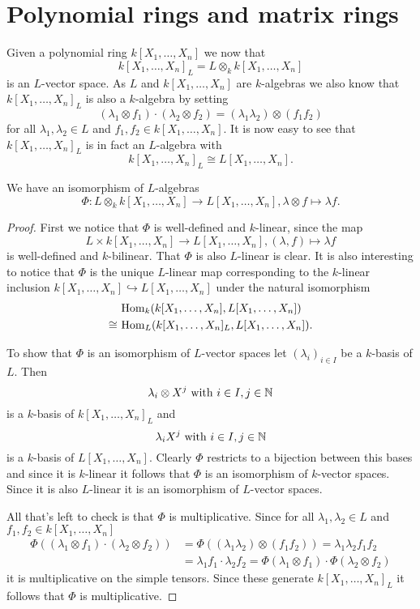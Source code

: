\section{Polynomial rings and matrix rings}
Given a polynomial ring $k[X_1, \dotsc, X_n]$ we now that
\[
 k[X_1, \dotsc, X_n]_L = L \otimes_k k[X_1, \dotsc, X_n]
\]
is an $L$-vector space. As $L$ and $k[X_1, \dotsc, X_n]$ are $k$-algebras we also know that $k[X_1, \dotsc, X_n]_L$ is also a $k$-algebra by setting
\[
 (\lambda_1 \otimes f_1) \cdot (\lambda_2 \otimes f_2) = (\lambda_1 \lambda_2) \otimes (f_1 f_2)
\]
for all $\lambda_1, \lambda_2 \in L$ and $f_1, f_2 \in k[X_1, \dotsc, X_n]$. It is now easy to see that $k[X_1, \dotsc, X_n]_L$ is in fact an $L$-algebra with
\[
 k[X_1, \dotsc, X_n]_L \cong L[X_1, \dotsc, X_n].
\]


\begin{prop}
 We have an isomorphism of $L$-algebras
 \[
  \Phi \colon L \otimes_k k[X_1, \dotsc, X_n] \to L[X_1, \dotsc, X_n], \lambda \otimes f \mapsto \lambda f.
 \]
\end{prop}
\begin{proof}
 First we notice that $\Phi$ is well-defined and $k$-linear, since the map
 \[
  L \times k[X_1, \dotsc, X_n] \to L[X_1, \dotsc, X_n], (\lambda,f) \mapsto \lambda f
 \]
 is well-defined and $k$-bilinear. That $\Phi$ is also $L$-linear is clear. It is also interesting to notice that $\Phi$ is the unique $L$-linear map corresponding to the $k$-linear inclusion $k[X_1, \dotsc, X_n] \hookrightarrow L[X_1, \dotsc, X_n]$ under the natural isomorphism
 \begin{align*}
       &\, \operatorname{Hom}_k(k[X_1, \dotsc, X_n], L[X_1, \dotsc, X_n]) \\
  \cong&\, \operatorname{Hom}_L(k[X_1, \dotsc, X_n]_L, L[X_1, \dotsc, X_n]).
 \end{align*}
 
 To show that $\Phi$ is an isomorphism of $L$-vector spaces let $(\lambda_i)_{i \in I}$ be a $k$-basis of $L$. Then
 \[
  \lambda_i \otimes X^j \text{ with } i \in I, j \in \mathbb{N}
 \]
 is a $k$-basis of $k[X_1, \dotsc, X_n]_L$ and
 \[
  \lambda_i X^j \text{ with } i \in I, j \in \mathbb{N}
 \]
 is a $k$-basis of $L[X_1, \dotsc, X_n]$. Clearly $\Phi$ restricts to a bijection between this bases and since it is $k$-linear it follows that $\Phi$ is an isomorphism of $k$-vector spaces. Since it is also $L$-linear it is an isomorphism of $L$-vector spaces.
 
 All that’s left to check is that $\Phi$ is multiplicative. Since for all $\lambda_1, \lambda_2 \in L$ and $f_1, f_2 \in k[X_1, \dotsc, X_n]$
 \begin{align*}
  \Phi((\lambda_1 \otimes f_1) \cdot (\lambda_2 \otimes f_2))
  &= \Phi((\lambda_1 \lambda_2) \otimes (f_1 f_2))
   = \lambda_1 \lambda_2 f_1 f_2 \\
  &= \lambda_1 f_1 \cdot \lambda_2 f_2
   = \Phi(\lambda_1 \otimes f_1) \cdot \Phi(\lambda_2 \otimes f_2)
 \end{align*}
 it is multiplicative on the simple tensors. Since these generate $k[X_1, \dotsc, X_n]_L$ it follows that $\Phi$ is multiplicative.
\end{proof}























